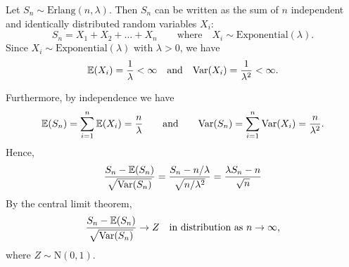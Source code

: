 \begin{solution}
Let $S_n\sim\text{Erlang}(n,\lambda)$. Then $S_n$ can be written as the sum of $n$ independent and identically distributed random variables $X_i$:
\[
S_n = X_1 + X_2 + \ldots + X_n\qquad\text{where}\quad X_i\sim\text{Exponential}(\lambda).
\]
Since $X_i\sim\text{Exponential}(\lambda)$ with $\lambda > 0$, we have 
\[
\mathbb{E}(X_i) = \frac{1}{\lambda} <\infty
\text{\quad and\quad}
\text{Var}(X_i) = \frac{1}{\lambda^2} <\infty.
\]

Furthermore, by independence we have
\[
\mathbb{E}(S_n)= \sum_{i=1}^n \mathbb{E}(X_i) = \frac{n}{\lambda}
\qquad\text{and}\qquad
\text{Var}(S_n) =  \sum_{i=1}^n \text{Var}(X_i) = \frac{n}{\lambda^2}.
\]
Hence,
\[
\frac{S_n - \mathbb{E}(S_n)}{\sqrt{\text{Var}(S_n)}} 
	= \frac{S_n - n/\lambda}{\sqrt{n/\lambda^2}} 
	= \frac{\lambda S_n - n}{\sqrt{n}} 
\]
By the central limit theorem,
\[
\frac{S_n - \mathbb{E}(S_n)}{\sqrt{\text{Var}(S_n)}} \to Z \quad\text{in distribution as $n\to\infty$,}
\]
where $Z\sim\text{N}(0,1)$. 
\end{solution}

